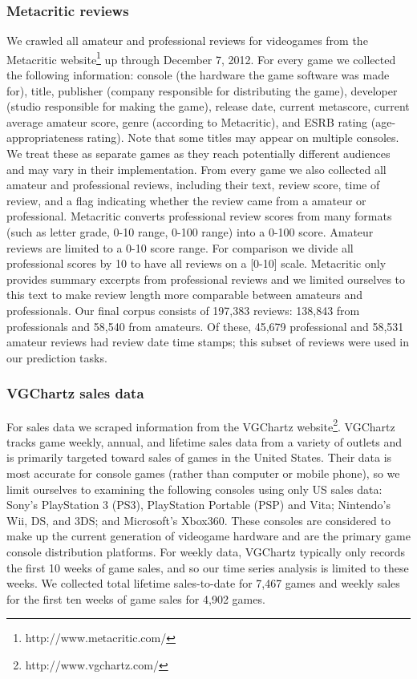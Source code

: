 \documentclass[letterpaper]{article}
\begin{document}
\subsubsection{Metacritic reviews}
We crawled all amateur and professional reviews for videogames from the Metacritic website\footnote{http://www.metacritic.com/} up through December 7, 2012. 
For every game we collected the following information: console (the hardware the game software was made for), title, publisher (company responsible for distributing the game), developer (studio responsible for making the game), release date, current metascore, current average amateur score, genre (according to Metacritic), and ESRB rating (age-appropriateness rating). Note that some titles may appear on multiple consoles. We treat these as separate games as they reach potentially different audiences and may vary in their implementation. From every game we also collected all amateur and professional reviews, including their text, review score, time of review, and a flag indicating whether the review came from a amateur or professional. Metacritic converts professional review scores from many formats (such as letter grade, 0-10 range, 0-100 range) into a 0-100 score. Amateur reviews are limited to a 0-10 score range. For comparison we divide all professional scores by 10 to have all reviews on a [0-10] scale. Metacritic only provides summary excerpts from professional reviews and we limited ourselves to this text to make review length more comparable between amateurs and professionals. Our final corpus consists of 197,383 reviews: 138,843 from professionals and 58,540 from amateurs. Of these, 45,679 professional and 58,531 amateur reviews had review date time stamps; this subset of reviews were used in our prediction tasks.

\subsubsection{VGChartz sales data}
For sales data we scraped information from the VGChartz website\footnote{http://www.vgchartz.com/}. VGChartz tracks game weekly, annual, and lifetime sales data from a variety of outlets and is primarily targeted toward sales of games in the United States. Their data is most accurate for console games (rather than computer or mobile phone), so we limit ourselves to examining the following consoles using only US sales data: Sony's PlayStation 3 (PS3), PlayStation Portable (PSP) and Vita; Nintendo's Wii, DS, and 3DS; and Microsoft's Xbox360. These consoles are considered to make up the current generation of videogame hardware and are the primary game console distribution platforms. For weekly data, VGChartz typically only records the first 10 weeks of game sales, and so our time series analysis is limited to these weeks. We collected total lifetime sales-to-date for 7,467 games and weekly sales for the first ten weeks of game sales for 4,902 games.
\end{document}
